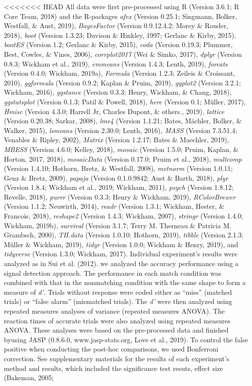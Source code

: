 \documentclass[
  man]{apa6}
\begin{document}
<<<<<<< HEAD
All data were first pre-processed using R (Version 3.6.1; R Core Team, 2018) and the R-packages \emph{afex} (Version 0.25.1; Singmann, Bolker, Westfall, \& Aust, 2019), \emph{BayesFactor} (Version 0.9.12.4.2; Morey \& Rouder, 2018), \emph{boot} (Version 1.3.23; Davison \& Hinkley, 1997; Gerlanc \& Kirby, 2015), \emph{bootES} (Version 1.2; Gerlanc \& Kirby, 2015), \emph{coda} (Version 0.19.3; Plummer, Best, Cowles, \& Vines, 2006), \emph{corrplot2017} (Wei \& Simko, 2017), \emph{dplyr} (Version 0.8.3; Wickham et al., 2019), \emph{emmeans} (Version 1.4.3; Lenth, 2019), \emph{forcats} (Version 0.4.0; Wickham, 2019a), \emph{Formula} (Version 1.2.3; Zeileis \& Croissant, 2010), \emph{ggformula} (Version 0.9.2; Kaplan \& Pruim, 2019), \emph{ggplot2} (Version 3.2.1; Wickham, 2016), \emph{ggstance} (Version 0.3.3; Henry, Wickham, \& Chang, 2018), \emph{ggstatsplot} (Version 0.1.3; Patil \& Powell, 2018), \emph{here} (Version 0.1; Müller, 2017), \emph{Hmisc} (Version 4.3.0; Harrell Jr, Charles Dupont, \& others., 2019), \emph{lattice} (Version 0.20.38; Sarkar, 2008), \emph{lme4} (Version 1.1.21; Bates, Mächler, Bolker, \& Walker, 2015), \emph{lsmeans} (Version 2.30.0; Lenth, 2016), \emph{MASS} (Version 7.3.51.4; Venables \& Ripley, 2002), \emph{Matrix} (Version 1.2.17; Bates \& Maechler, 2019), \emph{MBESS} (Version 4.6.0; Kelley, 2018), \emph{mosaic} (Version 1.5.0; Pruim, Kaplan, \& Horton, 2017, 2018), \emph{mosaicData} (Version 0.17.0; Pruim et al., 2018), \emph{multcomp} (Version 1.4.10; Hothorn, Bretz, \& Westfall, 2008), \emph{mvtnorm} (Version 1.0.11; Genz \& Bretz, 2009), \emph{papaja} (Version 0.1.0.9842; Aust \& Barth, 2018), \emph{plyr} (Version 1.8.4; Wickham et al., 2019; Wickham, 2011), \emph{psych} (Version 1.8.12; Revelle, 2018), \emph{purrr} (Version 0.3.3; Henry \& Wickham, 2019), \emph{RColorBrewer} (Version 1.1.2; Neuwirth, 2014), \emph{readr} (Version 1.3.1; Wickham, Hester, \& Francois, 2018), \emph{reshape2} (Version 1.4.3; Wickham, 2007), \emph{stringr} (Version 1.4.0; Wickham, 2019b), \emph{survival} (Version 3.1.7; Terry M. Therneau \& Patricia M. Grambsch, 2000), \emph{TH.data} (Version 1.0.10; Hothorn, 2019), \emph{tibble} (Version 2.1.3; Müller \& Wickham, 2019), \emph{tidyr} (Version 1.0.0; Wickham \& Henry, 2019), and \emph{tidyverse} (Version 1.3.0; Wickham, 2017). Individual experiment's results were analyzed as in Sui et al. (2012). we analyzed the accuracy performance using a signal detection approach. The performance in each match condition was combined with that in the nonmatching condition with the same shape to form a measure of \emph{d'}. Trials without response were coded either as \enquote{miss} (matched trials) or \enquote{false alarm} (mismatched trials). The \emph{d'} were then analyzed using repeated measures analyses of variance (repeated measures ANOVA). The reaction times of accurate trials were also analyzed using repeated measures ANOVA. These analyses were based on the pre-processed data and finished byusing JASP (0.8.6.0, www.jasp-stats.org, Love et al., 2019). To control the false positive when conducting the post-hoc comparisons, we used Bonferroni correction. See supplementary materials for the results of each experiment's method and results, which included the significance test resuts, effect size (Bakeman, 2005; 
\end{document}
